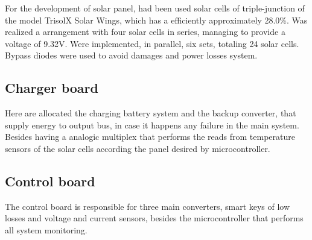 \documentclass[3p]{elsarticle}
\begin{document}
	For the development of solar panel, had been used solar cells of triple-junction of the model TrisolX Solar Wings, which has a efficiently approximately 28.0\%. Was realized a arrangement with four solar cells in series, managing to provide a voltage of 9.32V. Were implemented, in parallel, six sets, totaling 24 solar cells. Bypass diodes were used to avoid damages and power losses system.\cite{TrisolX}
		
\subsection{\textbf{Charger board}}
\label{Charger board}

	Here are allocated the charging battery system and the backup converter, that supply energy to output bus, in case it happens any failure in the main system. Besides having a analogic multiplex that performs the reads from temperature sensors of the solar cells according the panel desired by microcontroller.%

\subsection{\textbf{Control board}}
\label{Control board}

	The control board is responsible for three main converters, smart keys of low losses and voltage and current sensors, besides the microcontroller that performs all system monitoring.%
	
\end{document}
